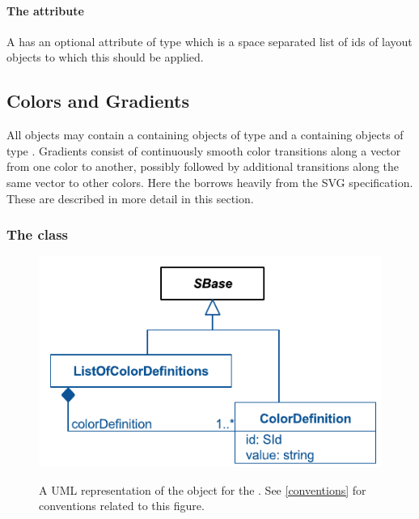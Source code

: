 \paragraph{The \fixttspace{} attribute}

A \LocalStyle has an optional attribute  of type
 which is a space separated list of ids of layout objects to 
which this \Style should be applied.


\subsection{Colors and Gradients}

All \RenderInformation objects may contain a \ListOfColorDefinitions containing 
objects of type \ColorDefinition and a \ListOfGradientDefinitions containing 
objects of type \GradientBase. Gradients consist of continuously smooth color 
transitions along a vector from one color to another, possibly followed by 
additional transitions along the same vector to other colors. Here the \RenderPackage 
borrows heavily from the SVG specification. These are described in more detail in this section. 
 
\subsubsection{The  class}
\label{colordefinition-class}

\begin{figure}[h!]
  \centering
  \includegraphics{images/render-color-definition-uml}\\
  \caption{A UML representation of the \ColorDefinition object for the \RenderPackage.  See \ref{conventions} for conventions related to this figure. }
  \label{fig:color_render_uml}
\end{figure}


